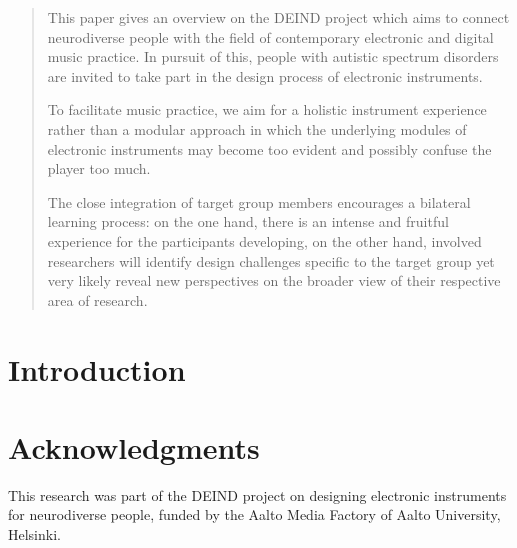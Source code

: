 \documentclass{acm_proc_article-sp}
\begin{document}
\maketitle
\begin{abstract}
	This paper gives an overview on the DEIND project which aims to connect neurodiverse people with the field of contemporary electronic and digital music practice. 
	In pursuit of this, people with autistic spectrum disorders are invited to take part in the design process of electronic instruments.

	To facilitate music practice, we aim for a holistic instrument experience rather than a modular approach in which the underlying modules of electronic instruments may become too evident and possibly confuse the player too much.

	The close integration of target group members encourages a bilateral learning process: on the one hand, there is an intense and fruitful experience for the participants developing, on the other hand, involved researchers will identify design challenges specific to the target group yet very likely reveal new perspectives on the broader view of their respective area of research.
\end{abstract}




\section{Introduction}


\section{Acknowledgments}
This research was part of the DEIND project on designing electronic instruments for neurodiverse people, funded by the Aalto Media Factory of Aalto University, Helsinki.  


 
\balancecolumns
\end{document}
